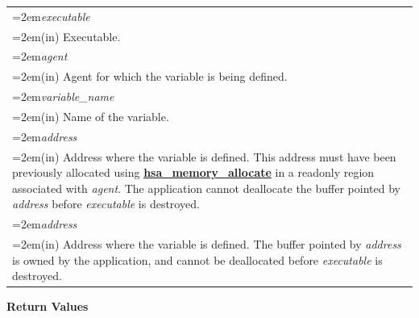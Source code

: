 \documentclass[final,oneside]{book}
\newcommand{\reffun}[1]{\textbf{#1}}
\newcommand{\refarg}[1]{\textit{#1}}
\begin{document}
\noindent\begin{longtable}{@{}>{\hangindent=2em}p{\textwidth}}
\refarg{executable}\\\hspace{2em}(in) Executable.\\[2mm]
\refarg{agent}\\\hspace{2em}(in) Agent for which the variable is being defined.\\[2mm]
\refarg{variable_\-name}\\\hspace{2em}(in) Name of the variable.\\[2mm]
\refarg{address}\\\hspace{2em}(in) Address where the variable is defined. This address must have been previously allocated using \hyperlink{group__memory_1ga39f7943b93aa2bb754726fc74d929426}{\reffun{hsa_\-memory_\-allocate}} in a readonly region associated with \textit{agent}. The application cannot deallocate the buffer pointed by \textit{address} before \textit{executable} is destroyed.\\[2mm]
\refarg{address}\\\hspace{2em}(in) Address where the variable is defined. The buffer pointed by \textit{address} is owned by the application, and cannot be deallocated before \textit{executable} is destroyed.
\end{longtable}
\vspace{-2mm}\textbf{Return Values}\\[-7mm]
\end{document}
